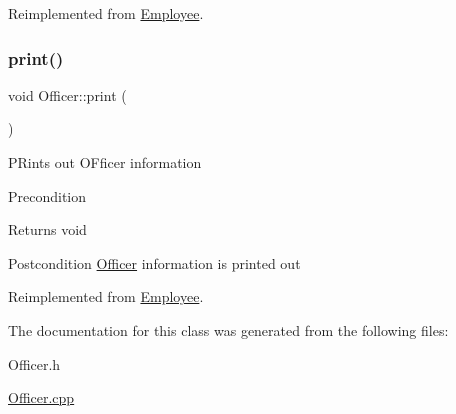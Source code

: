 Reimplemented from \hyperlink{classEmployee_a01c2c44e15434237db28832f6972e960}{Employee}.

\mbox{\label{classOfficer_aeadece05a1a0b7fb29bd412830d2e07a}} 
\subsubsection{\texorpdfstring{print()}{print()}}
{\footnotesize\ttfamily void Officer\+::print (\begin{DoxyParamCaption}{ }\end{DoxyParamCaption})\hspace{0.3cm}{\ttfamily [virtual]}}

P\+Rints out O\+Fficer information

\begin{DoxyPrecond}{Precondition}

\end{DoxyPrecond}
\begin{DoxyReturn}{Returns}
void 
\end{DoxyReturn}
\begin{DoxyPostcond}{Postcondition}
\hyperlink{classOfficer}{Officer} information is printed out 
\end{DoxyPostcond}


Reimplemented from \hyperlink{classEmployee_a79556ad700627dba88049f487a34a762}{Employee}.



The documentation for this class was generated from the following files\+:\begin{DoxyCompactItemize}
\item 
Officer.\+h\item 
\hyperlink{Officer_8cpp}{Officer.\+cpp}\end{DoxyCompactItemize}
